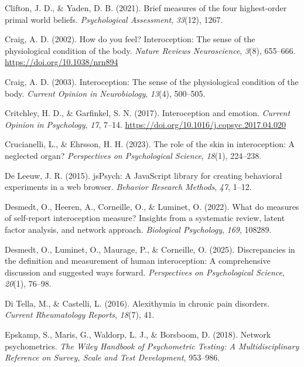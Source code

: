 \documentclass[
  man,
  floatsintext,
  longtable,
  nolmodern,
  notxfonts,
  notimes,
  mask,
  colorlinks=true,linkcolor=blue,citecolor=blue,urlcolor=blue]{apa7}
\newlength{\cslhangindent}
\newenvironment{CSLReferences}[2] %
 {\begin{list}{}{%
  \setlength{\itemindent}{0pt}
  \setlength{\leftmargin}{0pt}
  \setlength{\parsep}{0pt}
  \ifodd #1
   \setlength{\leftmargin}{\cslhangindent}
   \setlength{\itemindent}{-1\cslhangindent}
  \fi
  \setlength{\itemsep}{#2\baselineskip}}}
 {\end{list}}
\begin{document}
\begin{CSLReferences}{1}{0}
Clifton, J. D., \& Yaden, D. B. (2021). Brief measures of the four
highest-order primal world beliefs. \emph{Psychological Assessment},
\emph{33}(12), 1267.

Craig, A. D. (2002). How do you feel? Interoception: The sense of the
physiological condition of the body. \emph{Nature Reviews Neuroscience},
\emph{3}(8), 655--666. \url{https://doi.org/10.1038/nrn894}

Craig, A. D. (2003). Interoception: The sense of the physiological
condition of the body. \emph{Current Opinion in Neurobiology},
\emph{13}(4), 500--505.

Critchley, H. D., \& Garfinkel, S. N. (2017). Interoception and emotion.
\emph{Current Opinion in Psychology}, \emph{17}, 7--14.
\url{https://doi.org/10.1016/j.copsyc.2017.04.020}

Crucianelli, L., \& Ehrsson, H. H. (2023). The role of the skin in
interoception: A neglected organ? \emph{Perspectives on Psychological
Science}, \emph{18}(1), 224--238.

De Leeuw, J. R. (2015). jsPsych: A JavaScript library for creating
behavioral experiments in a web browser. \emph{Behavior Research
Methods}, \emph{47}, 1--12.

Desmedt, O., Heeren, A., Corneille, O., \& Luminet, O. (2022). What do
measures of self-report interoception measure? Insights from a
systematic review, latent factor analysis, and network approach.
\emph{Biological Psychology}, \emph{169}, 108289.

Desmedt, O., Luminet, O., Maurage, P., \& Corneille, O. (2025).
Discrepancies in the definition and measurement of human interoception:
A comprehensive discussion and suggested ways forward.
\emph{Perspectives on Psychological Science}, \emph{20}(1), 76--98.

Di Tella, M., \& Castelli, L. (2016). Alexithymia in chronic pain
disorders. \emph{Current Rheumatology Reports}, \emph{18}(7), 41.

Epskamp, S., Maris, G., Waldorp, L. J., \& Borsboom, D. (2018). Network
psychometrics. \emph{The Wiley Handbook of Psychometric Testing: A
Multidisciplinary Reference on Survey, Scale and Test Development},
953--986.


\end{CSLReferences}
\end{document}
